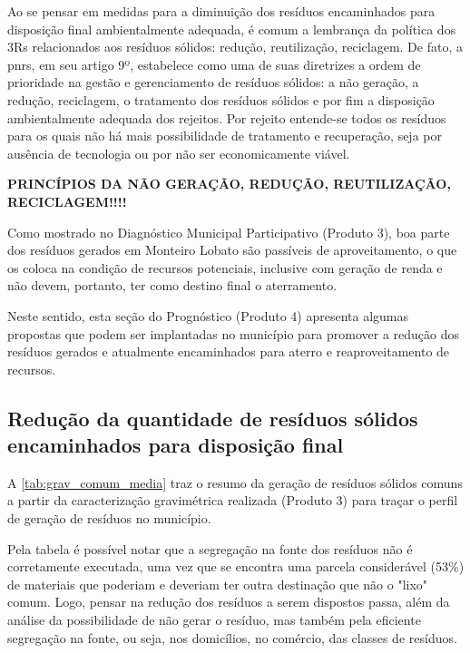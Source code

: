 Ao se pensar em medidas para a diminuição dos resíduos encaminhados para disposição final ambientalmente adequada, é comum a lembrança da política dos 3Rs relacionados aos resíduos sólidos: redução, reutilização, reciclagem. De fato, a \gls{pnrs}, em seu artigo 9º, estabelece como uma de suas diretrizes a ordem de prioridade na gestão e gerenciamento de resíduos sólidos: a não geração, a redução, reciclagem, o tratamento dos resíduos sólidos e por fim a disposição ambientalmente adequada dos rejeitos. \cite{brasil:12305} Por rejeito entende-se todos os resíduos para os quais não há mais possibilidade de tratamento e recuperação, seja por ausência de tecnologia ou por não ser economicamente viável.

\textbf{PRINCÍPIOS DA NÃO GERAÇÃO, REDUÇÃO, REUTILIZAÇÃO, RECICLAGEM!!!!}

Como mostrado no Diagnóstico Municipal Participativo (Produto 3), boa parte dos resíduos gerados em Monteiro Lobato são passíveis de aproveitamento, o que os coloca na condição de recursos potenciais, inclusive com geração de renda e não devem, portanto, ter como destino final o aterramento. 

Neste sentido, esta seção do Prognóstico (Produto 4) apresenta algumas propostas que podem ser implantadas no município para promover a redução dos resíduos gerados e atualmente encaminhados para aterro e reaproveitamento de recursos.


\subsection{Redução da quantidade de resíduos sólidos encaminhados para disposição final}

A \autoref{tab:grav_comum_media} traz o resumo da geração de resíduos sólidos comuns a partir da caracterização gravimétrica realizada (Produto 3) para traçar o perfil de geração de resíduos no município. 


	

Pela tabela é possível notar que a segregação na fonte dos resíduos não é corretamente executada, uma vez que se encontra uma parcela considerável (53\%) de materiais que poderiam e deveriam ter outra destinação que não o "lixo" comum. Logo, pensar na redução dos resíduos a serem dispostos passa, além da análise da possibilidade de não gerar o resíduo, mas também pela eficiente segregação na fonte, ou seja, nos domicílios, no comércio, das classes de resíduos. 

